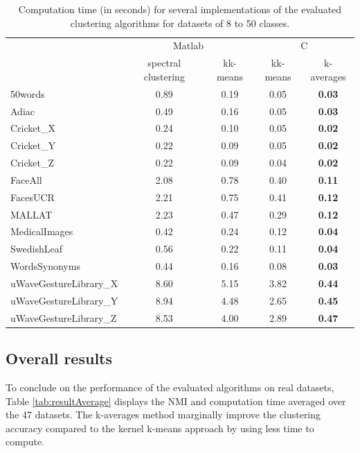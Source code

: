 \documentclass[natbib,smallextended]{svjour3}
\begin{document}
\begin{table}
\begin{center}
\caption{Computation time (in seconds) for several implementations of the evaluated clustering algorithms for datasets of 8 to 50 classes.}
\label{tab:resultSpeed-8}
\begin{tabular}{lcccc}
  & \multicolumn{2}{c}{Matlab} & \multicolumn{2}{c}{C} \\
  & spectral clustering & kk-means & kk-means & k-averages \\
\hline
50words & 0.89 & 0.19 & 0.05 & \textbf{0.03} \\
Adiac & 0.49 & 0.16 & 0.05 & \textbf{0.03} \\
Cricket\_X & 0.24 & 0.10 & 0.05 & \textbf{0.02} \\
Cricket\_Y & 0.22 & 0.09 & 0.05 & \textbf{0.02} \\
Cricket\_Z & 0.22 & 0.09 & 0.04 & \textbf{0.02} \\
FaceAll & 2.08 & 0.78 & 0.40 & \textbf{0.11} \\
FacesUCR & 2.21 & 0.75 & 0.41 & \textbf{0.12} \\
MALLAT & 2.23 & 0.47 & 0.29 & \textbf{0.12} \\
MedicalImages & 0.42 & 0.24 & 0.12 & \textbf{0.04} \\
SwedishLeaf & 0.56 & 0.22 & 0.11 & \textbf{0.04} \\
WordsSynonyms & 0.44 & 0.16 & 0.08 & \textbf{0.03} \\
uWaveGestureLibrary\_X & 8.60 & 5.15 & 3.82 & \textbf{0.44} \\
uWaveGestureLibrary\_Y & 8.94 & 4.48 & 2.65 & \textbf{0.45} \\
uWaveGestureLibrary\_Z & 8.53 & 4.00 & 2.89 & \textbf{0.47} \\
\end{tabular}
\end{center}
\end{table}


\subsection{Overall results}

To conclude on the performance of the evaluated algorithms on real datasets, Table \ref{tab:resultAverage} displays the NMI and computation time averaged over the 47 datasets. The k-averages method marginally improve the clustering accuracy compared to the kernel k-means approach by using less time to compute.
\end{document}
